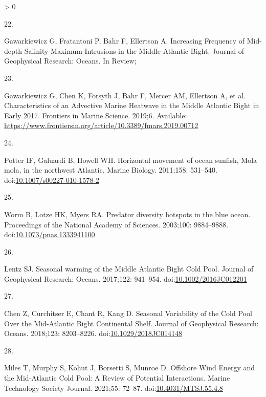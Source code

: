 \documentclass[
  10pt,
]{article}
\newlength{\cslhangindent}
\newlength{\csllabelwidth}
\newenvironment{CSLReferences}[2] %
 {%
  \setlength{\parindent}{0pt}
  \ifodd #1 \everypar{\setlength{\hangindent}{\cslhangindent}}\ignorespaces\fi
  \ifnum #2 > 0
  \setlength{\parskip}{#2\baselineskip}
  \fi
 }%
 {}
\newcommand{\CSLLeftMargin}[1]{\parbox[t]{\csllabelwidth}{#1}}
\newcommand{\CSLRightInline}[1]{\parbox[t]{\linewidth - \csllabelwidth}{#1}\break}
\begin{document}
\begin{CSLReferences}{0}{0}
\leavevmode\hypertarget{ref-gawarkiewicz_increasing_nodate}{}%
\CSLLeftMargin{22. }
\CSLRightInline{Gawarkiewicz G, Fratantoni P, Bahr F, Ellertson A.
Increasing {Frequency} of {Mid}-depth {Salinity} {Maximum} {Intrusions}
in the {Middle} {Atlantic} {Bight}. Journal of Geophysical Research:
Oceans. In Review; }

\leavevmode\hypertarget{ref-gawarkiewicz_characteristics_2019}{}%
\CSLLeftMargin{23. }
\CSLRightInline{Gawarkiewicz G, Chen K, Forsyth J, Bahr F, Mercer AM,
Ellertson A, et al. Characteristics of an {Advective} {Marine}
{Heatwave} in the {Middle} {Atlantic} {Bight} in {Early} 2017. Frontiers
in Marine Science. 2019;6. Available:
\url{https://www.frontiersin.org/article/10.3389/fmars.2019.00712}}

\leavevmode\hypertarget{ref-potter_horizontal_2011}{}%
\CSLLeftMargin{24. }
\CSLRightInline{Potter IF, Galuardi B, Howell WH. Horizontal movement of
ocean sunfish, {Mola} mola, in the northwest {Atlantic}. Marine Biology.
2011;158: 531--540.
doi:\href{https://doi.org/10.1007/s00227-010-1578-2}{10.1007/s00227-010-1578-2}}

\leavevmode\hypertarget{ref-worm_predator_2003}{}%
\CSLLeftMargin{25. }
\CSLRightInline{Worm B, Lotze HK, Myers RA. Predator diversity hotspots
in the blue ocean. Proceedings of the National Academy of Sciences.
2003;100: 9884--9888.
doi:\href{https://doi.org/10.1073/pnas.1333941100}{10.1073/pnas.1333941100}}

\leavevmode\hypertarget{ref-lentz_seasonal_2017}{}%
\CSLLeftMargin{26. }
\CSLRightInline{Lentz SJ. Seasonal warming of the {Middle} {Atlantic}
{Bight} {Cold} {Pool}. Journal of Geophysical Research: Oceans.
2017;122: 941--954.
doi:\href{https://doi.org/10.1002/2016JC012201}{10.1002/2016JC012201}}

\leavevmode\hypertarget{ref-chen_seasonal_2018}{}%
\CSLLeftMargin{27. }
\CSLRightInline{Chen Z, Curchitser E, Chant R, Kang D. Seasonal
{Variability} of the {Cold} {Pool} {Over} the {Mid}-{Atlantic} {Bight}
{Continental} {Shelf}. Journal of Geophysical Research: Oceans.
2018;123: 8203--8226.
doi:\href{https://doi.org/10.1029/2018JC014148}{10.1029/2018JC014148}}

\leavevmode\hypertarget{ref-miles_offshore_2021}{}%
\CSLLeftMargin{28. }
\CSLRightInline{Miles T, Murphy S, Kohut J, Borsetti S, Munroe D.
Offshore {Wind} {Energy} and the {Mid}-{Atlantic} {Cold} {Pool}: {A}
{Review} of {Potential} {Interactions}. Marine Technology Society
Journal. 2021;55: 72--87.
doi:\href{https://doi.org/10.4031/MTSJ.55.4.8}{10.4031/MTSJ.55.4.8}}


\end{CSLReferences}
\end{document}

